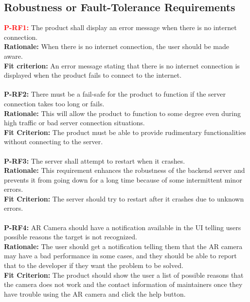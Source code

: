 \documentclass[12pt]{article}
\begin{document}
\subsection{Robustness or Fault-Tolerance Requirements}
  \textbf{\textcolor{red}{P-RF1:}} The product shall display an error message when there is no internet connection.\\
  \textbf{Rationale:} When there is no internet connection, the user should be made aware.\\
  \textbf{Fit criterion:} An error message stating that there is no internet connection is displayed when the product fails to connect to the internet.\\\\
  \textbf{P-RF2:} There must be a fail-safe for the product to function if the server connection takes too long or fails.\\
  \textbf{Rationale:} This will allow the product to function to some degree even during high traffic or bad server connection situations.\\
  \textbf{Fit Criterion:} The product must be able to provide rudimentary functionalities without connecting to the server.\\\\
  \textbf{P-RF3:} The server shall attempt to restart when it crashes.\\
  \textbf{Rationale:} This requirement enhances the robustness of the backend server and prevents it from going down for a long time because of some intermittent minor errors.\\
  \textbf{Fit Criterion:} The server should try to restart after it crashes due to unknown errors.\\\\
  \textbf{P-RF4:} AR Camera should have a notification available in the UI telling users possible reasons the target is not recognized.\\
  \textbf{Rationale:} The user should get a notification telling them that the AR camera may have a bad performance in some cases, and they should be able to report that to the developer if they want the problem to be solved.\\
  \textbf{Fit Criterion:} The product should show the user a list of possible reasons that the camera does not work and the contact information of maintainers once they have trouble using the AR camera and click the help button.\\\\
\end{document}
